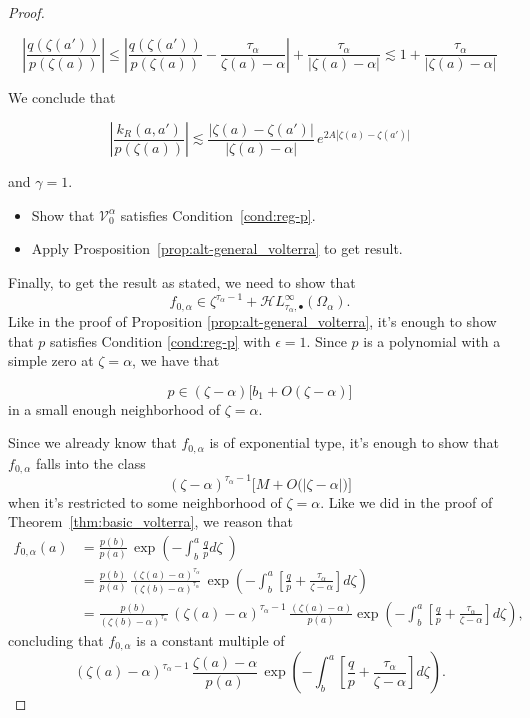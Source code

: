 \documentclass{article}
\theoremstyle{plain}
\newcommand{\singexp}[2]{\mathcal{H}L^\infty_{#1, #2}}
\newcommand{\singexpalg}[1]{\singexp{#1}{\bullet}}
\newcommand{\hardpart}{\mathcal{V}_0}
\newcommand{\domain}{\Omega}
\newenvironment{brainstorm}{\color{violet}\begin{itemize}}{\end{itemize}\color{black}}
\begin{document}
\begin{proof}
\begin{itemize}
\[    \left\vert \frac{q(\zeta(a'))}{p(\zeta(a))}\right\vert  \leq \left\vert \frac{q(\zeta(a'))}{p(\zeta(a))} -\frac{\tau_\alpha}{\zeta(a)-\alpha}\right\vert + \frac{\tau_\alpha}{|\zeta(a)-\alpha|}\lesssim 1 +  \frac{\tau_\alpha}{|\zeta(a)-\alpha|} \]

We conclude that 

\[\left\vert \frac{k_R(a,a')}{p(\zeta(a))}\right\vert \lesssim \frac{|\zeta(a)-\zeta(a')|}{|\zeta(a)-\alpha|}\, e^{2A |\zeta(a)-\zeta(a')|}  \]

and $\gamma=1$.
\end{itemize}
\begin{brainstorm}
\item Show that $\hardpart^\alpha$ satisfies Condition~\eqref{cond:reg-p}.
\item Apply Prosposition~\ref{prop:alt-general_volterra} to get result.
\end{brainstorm}
\par\color{Tomato}
Finally, to get the result as stated, we need to show that
\[ f_{0, \alpha} \in \zeta^{\tau_\alpha - 1} + \singexpalg{\tau_\alpha}(\domain_\alpha). \]
Like in the proof of Proposition \ref{prop:alt-general_volterra}, it's enough to show that $p$ satisfies Condition \eqref{cond:reg-p} with $\epsilon=1$. Since $p$ is a polynomial with a simple zero at $\zeta=\alpha$, we have that

\[ p \in (\zeta-\alpha)\Big[ b_1 + O(\zeta-\alpha)\Big] \]
in a small enough neighborhood of $\zeta=\alpha$. 

\color{RoyalBlue}
Since we already know that $f_{0, \alpha}$ is of exponential type, it's enough to show that $f_{0, \alpha}$ falls into the class
\[ (\zeta - \alpha)^{\tau_\alpha-1}\Big[M + O\big(|\zeta - \alpha|\big)\Big] \]
when it's restricted to some neighborhood of $\zeta = \alpha$. Like we did in the proof of Theorem~\ref{thm:basic_volterra}, we reason that
\begin{align*}
f_{0,\alpha}(a)&=\frac{p(b)}{p(a)}\, \exp\left(-\int_b^a\frac{q}{p} d\zeta\;\right)\\
&=\frac{p(b)}{p(a)}\,\frac{(\zeta(a)-\alpha)^{\tau_\alpha}}{(\zeta(b)-\alpha)^{\tau_\alpha}}\,\exp\left(-\int_b^a \left[\frac{q}{p}+\frac{\tau_\alpha}{\zeta-\alpha}\right] d\zeta\right)\\
& = \frac{p(b)}{(\zeta(b)-\alpha)^{\tau_\alpha}}\,(\zeta(a)-\alpha)^{\tau_\alpha-1}\,\frac{(\zeta(a) - \alpha)}{p(a)} \exp\left(-\int_b^a\left[\frac{q}{p}+\frac{\tau_\alpha}{\zeta-\alpha}\right] d\zeta\right),
\end{align*}
concluding that $f_{0,\alpha}$ is a constant multiple of
\[ (\zeta(a)-\alpha)^{\tau_\alpha-1}\,\frac{\zeta(a)-\alpha}{p(a)} \, \exp\left(-\int_b^a\left[\frac{q}{p}+\frac{\tau_\alpha}{\zeta-\alpha}\right] d\zeta\right). \]


\end{proof}
\end{document}
